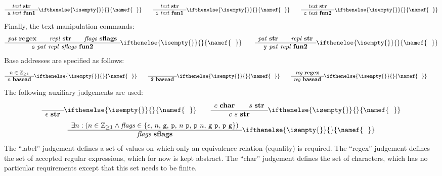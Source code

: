 \documentclass[11pt]{article}
\newcommand{\ifempty}[3]{\ifthenelse{\isempty{#1}}{#2}{#3}}
\newcommand\RULE[3][]{\begin{array}{c} #2 \\ \hline #3 \end{array}\ifempty{#1}{}{\namef{\text{\ \ #1}}}}
\newcommand\J[1]{\ensuremath{\textbf{#1}}}
\newcommand\cmd[1]{\ensuremath{\text{\texttt{#1}}}}
\renewcommand\arg[1]{\ensuremath{\mathit{#1}}}
\begin{document}
\begin{gather*}
	\RULE{\arg{text}\ \J{str}}{\cmd{a}\ \arg{text}\ \J{fun1}} \qquad
	\RULE{\arg{text}\ \J{str}}{\cmd{i}\ \arg{text}\ \J{fun1}} \qquad
	\RULE{\arg{text}\ \J{str}}{\cmd{c}\ \arg{text}\ \J{fun2}}
\end{gather*}
Finally, the text manipulation commands:
\begin{gather*}
	\RULE{\arg{pat}\ \J{regex} \qquad \arg{repl}\ \J{str} \qquad \arg{flags}\ \J{sflags}}{\cmd{s}\ \arg{pat}\ \arg{repl}\ \arg{sflags}\ \J{fun2}} \qquad
	\RULE{\arg{pat}\ \J{str} \qquad \arg{repl}\ \J{str}}{\cmd{y}\ \arg{pat}\ \arg{repl}\ \J{fun2}}
\end{gather*}
Base addresses are specified as follows:
\begin{gather*}
	\RULE{n \in \mathbb{Z}_{\geq 1}}{n\ \J{basead}} \qquad
	\RULE{}{\cmd{\$}\ \J{basead}} \qquad
	\RULE{\arg{reg}\ \J{regex}}{\arg{reg}\ \J{basead}} \qquad
\end{gather*}
The following auxiliary judgements are used:
\begin{gather*}
	\RULE{}{\epsilon\ \J{str}} \qquad
	\RULE{c\ \J{char} \qquad s\ \J{str}}{c\ s\ \J{str}} \\
	\RULE{\exists n : (n \in \mathbb{Z}_{\geq1} \land \arg{flags} \in \{\epsilon,\, n,\, \cmd{g},\, \cmd{p},\, n\ \cmd{p},\, \cmd{p}\ n,\, \cmd{g}\ \cmd{p},\, \cmd{p}\ \cmd{g}\})}{\arg{flags}\ \J{sflags}}
\end{gather*}
The ``label'' judgement defines a set of values on which only an equivalence relation (equality) is required.
The ``regex'' judgement defines the set of accepted regular expressions, which for now is kept abstract.
The ``char'' judgement defines the set of characters, which has no particular requirements except that this set needs to be finite.
\end{document}
